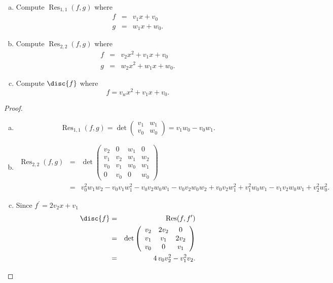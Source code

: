\documentclass[10pt]{amsart}
\begin{document}
\begin{thm}
  \begin{enumerate}[(a)]
  \item
    Compute $\operatorname{Res}_{1,1}(f,g)$ where
    \begin{eqnarray*}
      f &=& v_1 x + v_0\\
      g &=& w_1x + w_0.
    \end{eqnarray*}
  \item
    Compute $\operatorname{Res}_{2,2}(f,g)$ where
    \begin{eqnarray*}
      f &=& v_2x^2 + v_1x + v_0\\
      g &=& w_2x^2 + w_1x + w_0.
    \end{eqnarray*}
  \item
    Compute $\disc{f}$ where
    $$f = v_wx^2 + v_1x + v_0.$$
  \end{enumerate}
  
  \begin{proof}
    \begin{enumerate}[(a)]
    \item
      $$\operatorname{Res}_{1,1}(f,g) = \det\left(\begin{array}{cc}
      v_1 & w_1\\
      v_0 & w_0
    \end{array}\right) = v_{1} w_{0} -v_{0} w_{1}.$$
    \item
      \begin{eqnarray*}
        \operatorname{Res}_{2,2}(f,g) &=& \det\left(\begin{array}{cccc}
          v_2 & 0 & w_1 & 0\\
          v_1 & v_2 & w_1 & w_2\\
          v_0 & v_1 & w_0 & w_1\\
          0 & v_0 & 0 & w_0
        \end{array}\right)\\
        &=& v_{0}^{2} w_{1} w_{2} - v_{0} v_{1} w_{1}^{2} - v_{0} v_{2} w_{0} w_{1}
        - v_{0} v_{2} w_{0} w_{2} + v_{0} v_{2} w_{1}^{2} + v_{1}^{2} w_{0}
        w_{1} - v_{1} v_{2} w_{0} w_{1} + v_{2}^{2} w_{0}^{2}.
      \end{eqnarray*}
    \item
      Since $f^\prime = 2v_2x + v_1$
      \begin{eqnarray*}
        \disc{f} &=& \operatorname{Res}(f,f^\prime)\\
        &=& \det \left(\begin{array}{ccc}
          v_2 & 2v_2 & 0\\
          v_1 & v_1 & 2v_2\\
          v_0 & 0 & v_1
        \end{array}\right)\\
        &=& 4 \, v_{0} v_{2}^{2} - v_{1}^{2} v_{2}.
      \end{eqnarray*}
    \end{enumerate}
  \end{proof}
\end{thm}
\end{document}
